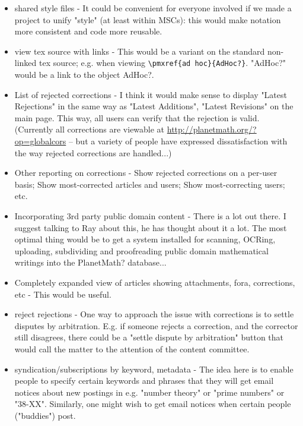 \begin{itemize}
\item shared style files - It could be convenient for everyone involved if we made a project to unify "style" (at least within MSCs): this would make notation more consistent and code more reusable. 

\item view tex source with links - This would be a variant on the standard non-linked tex source; e.g. when viewing \verb|\pmxref{ad hoc}{AdHoc?}|. "AdHoc?" would be a link to the object AdHoc?. 

\item List of rejected corrections - I think it would make sense to display "Latest Rejections" in the same way as "Latest Additions", "Latest Revisions" on the main page. This way, all users can verify that the rejection is valid. (Currently all corrections are viewable at \url{http://planetmath.org/?op=globalcors} -- but a variety of people have expressed dissatisfaction with the way rejected corrections are handled...) 

\item Other reporting on corrections - Show rejected corrections on a per-user basis; Show most-corrected articles and users; Show most-correcting users; etc. 

\item Incorporating 3rd party public domain content - There is a lot out there. I suggest talking to Ray about this, he has thought about it a lot. The most optimal thing would be to get a system installed for scanning, OCRing, uploading, subdividing and proofreading public domain mathematical writings into the PlanetMath? database... 

\item Completely expanded view of articles showing attachments, fora, corrections, etc - This would be useful. 

\item reject rejections - One way to approach the issue with corrections is to settle disputes by arbitration. E.g. if someone rejects a correction, and the corrector still disagrees, there could be a "settle dispute by arbitration" button that would call the matter to the attention of the content committee. 

\item syndication/subscriptions by keyword, metadata - The idea here is to enable people to specify certain keywords and phrases that they will get email notices about new postings in e.g. "number theory" or "prime numbers" or "38-XX". Similarly, one might wish to get email notices when certain people ("buddies") post. 


\end{itemize}
